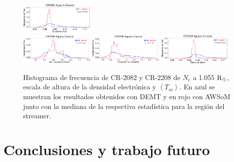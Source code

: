 \documentclass[baaa]{baaa}
\begin{document}
\begin{figure}
  \includegraphics[width=0.32\textwidth]{figuras/proceeding_2082_demt_awsom_CH_lambda_n.eps}\\
  \includegraphics[width=0.32\textwidth]{figuras/proceeding_2208_demt_awsom_CH_ne_1055.eps}
  \includegraphics[width=0.32\textwidth]{figuras/proceeding_2208_demt_awsom_CH_Tm.eps}
  \includegraphics[width=0.32\textwidth]{figuras/proceeding_2208_demt_awsom_CH_lambda_n.eps}
  \caption{Histograma de frecuencia de CR-2082 y CR-2208 de $N_e$ a 1.055 ${\rm R_\odot}$, escala de altura de la densidad electrónica y $\left<T_m\right>$. En azul se muestran los resultados obtenidos con DEMT y en rojo con AWSoM junto con la mediana de la respectiva estadística para la región del streamer.}
  \label{fig-histos}
\end{figure}


\section{Conclusiones y trabajo futuro}
\end{document}
